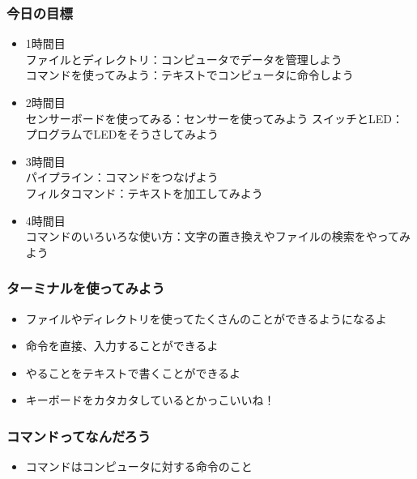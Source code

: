 \begin{frame}
    \frametitle{今日の目標} 
    \begin{itemize}
        \item 1時間目\\
        {\footnotesize ファイルとディレクトリ：コンピュータでデータを管理しよう\\
        コマンドを使ってみよう：テキストでコンピュータに命令しよう\\}
        \item 2時間目\\
        {\footnotesize センサーボードを使ってみる：センサーを使ってみよう 
        スイッチとLED：プログラムでLEDをそうさしてみよう\\}
        \item 3時間目\\
        {\footnotesize パイプライン：コマンドをつなげよう\\
        フィルタコマンド：テキストを加工してみよう\\}
        \item 4時間目\\
        {\footnotesize コマンドのいろいろな使い方：文字の置き換えやファイルの検索をやってみよう\\}
    \end{itemize}
\end{frame}

\begin{frame}
    \frametitle{ターミナルを使ってみよう}
    \begin{itemize}
        \item ファイルやディレクトリを使ってたくさんのことができるようになるよ
        \item 命令を直接、入力することができるよ
        \item やることをテキストで書くことができるよ
        \item キーボードをカタカタしているとかっこいいね！
    \end{itemize}
    \begin{figure}[h]
        \centering
        
    \end{figure}
\end{frame}

\begin{frame}
    \frametitle{コマンドってなんだろう}
    \begin{itemize}
        \item コマンドはコンピュータに対する命令のこと
    \end{itemize}
    \begin{figure}[h]
        \centering
        
    \end{figure}
\end{frame}

